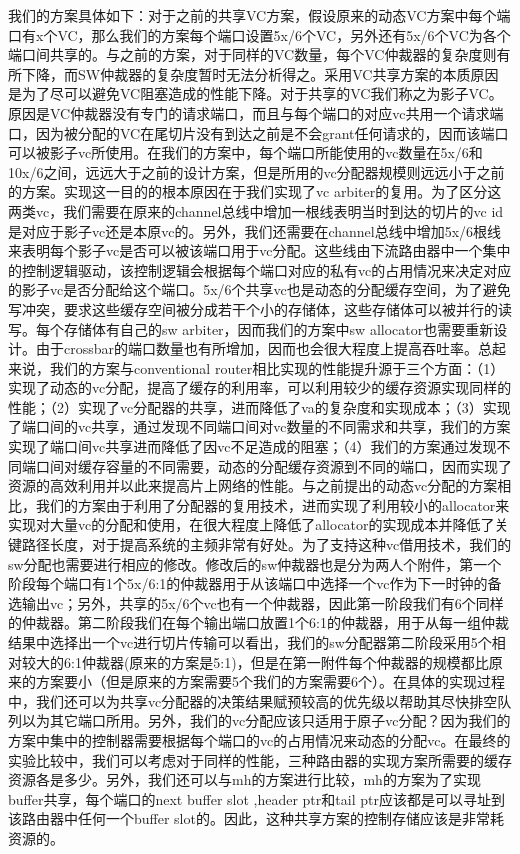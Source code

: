 ﻿\documentclass[10pt,journal]{IEEEtran}
\begin{document}
我们的方案具体如下：对于之前的共享VC方案，假设原来的动态VC方案中每个端口有x个VC，那么我们的方案每个端口设置5x/6个VC，另外还有5x/6个VC为各个端口间共享的。与之前的方案，对于同样的VC数量，每个VC仲裁器的复杂度则有所下降，而SW仲裁器的复杂度暂时无法分析得之。采用VC共享方案的本质原因是为了尽可以避免VC阻塞造成的性能下降。对于共享的VC我们称之为影子VC。原因是VC仲裁器没有专门的请求端口，而且与每个端口的对应vc共用一个请求端口，因为被分配的VC在尾切片没有到达之前是不会grant任何请求的，因而该端口可以被影子vc所使用。在我们的方案中，每个端口所能使用的vc数量在5x/6和10x/6之间，远远大于之前的设计方案，但是所用的vc分配器规模则远远小于之前的方案。实现这一目的的根本原因在于我们实现了vc arbiter的复用。为了区分这两类vc，我们需要在原来的channel总线中增加一根线表明当时到达的切片的vc id是对应于影子vc还是本原vc的。另外，我们还需要在channel总线中增加5x/6根线来表明每个影子vc是否可以被该端口用于vc分配。这些线由下流路由器中一个集中的控制逻辑驱动，该控制逻辑会根据每个端口对应的私有vc的占用情况来决定对应的影子vc是否分配给这个端口。5x/6个共享vc也是动态的分配缓存空间，为了避免写冲突，要求这些缓存空间被分成若干个小的存储体，这些存储体可以被并行的读写。每个存储体有自己的sw arbiter，因而我们的方案中sw allocator也需要重新设计。由于crossbar的端口数量也有所增加，因而也会很大程度上提高吞吐率。总起来说，我们的方案与conventional router相比实现的性能提升源于三个方面：（1）实现了动态的vc分配，提高了缓存的利用率，可以利用较少的缓存资源实现同样的性能；（2）实现了vc分配器的共享，进而降低了va的复杂度和实现成本；（3）实现了端口间的vc共享，通过发现不同端口间对vc数量的不同需求和共享，我们的方案实现了端口间vc共享进而降低了因vc不足造成的阻塞；（4）我们的方案通过发现不同端口间对缓存容量的不同需要，动态的分配缓存资源到不同的端口，因而实现了资源的高效利用并以此来提高片上网络的性能。与之前提出的动态vc分配的方案相比，我们的方案由于利用了分配器的复用技术，进而实现了利用较小的allocator来实现对大量vc的分配和使用，在很大程度上降低了allocator的实现成本并降低了关键路径长度，对于提高系统的主频非常有好处。为了支持这种vc借用技术，我们的sw分配也需要进行相应的修改。修改后的sw仲裁器也是分为两人个附件，第一个阶段每个端口有1个5x/6:1的仲裁器用于从该端口中选择一个vc作为下一时钟的备选输出vc；另外，共享的5x/6个vc也有一个仲裁器，因此第一阶段我们有6个同样的仲裁器。第二阶段我们在每个输出端口放置1个6:1的仲裁器，用于从每一组仲裁结果中选择出一个vc进行切片传输可以看出，我们的sw分配器第二阶段采用5个相对较大的6:1仲裁器(原来的方案是5:1)，但是在第一附件每个仲裁器的规模都比原来的方案要小（但是原来的方案需要5个我们的方案需要6个）。在具体的实现过程中，我们还可以为共享vc分配器的决策结果赋预较高的优先级以帮助其尽快排空队列以为其它端口所用。另外，我们的vc分配应该只适用于原子vc分配？因为我们的方案中集中的控制器需要根据每个端口的vc的占用情况来动态的分配vc。在最终的实验比较中，我们可以考虑对于同样的性能，三种路由器的实现方案所需要的缓存资源各是多少。另外，我们还可以与mh的方案进行比较，mh的方案为了实现buffer共享，每个端口的next buffer slot ,header ptr和tail ptr应该都是可以寻址到该路由器中任何一个buffer slot的。因此，这种共享方案的控制存储应该是非常耗资源的。
\end{document}
